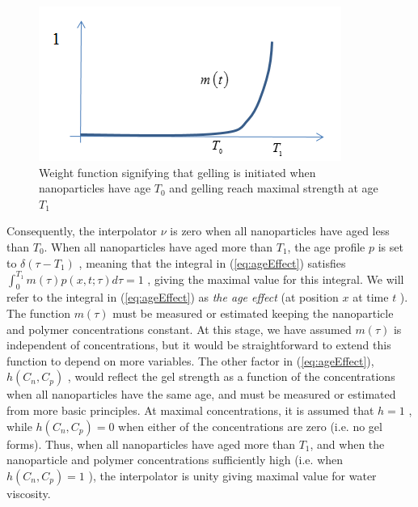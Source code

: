 \begin{figure}[h]
    \centering
    \includegraphics[width=.85\textwidth]{img/fig/weightFunc.png}
    \caption{Weight function signifying that gelling is initiated when nanoparticles have age $T_0$ and gelling reach maximal strength at age $T_1$}
    \label{fig:weightFunc}
\end{figure}

Consequently, the interpolator  $\nu$ is zero when all nanoparticles have aged less than  $T_0$. When all nanoparticles have aged more than  $T_1$, the age profile $p$ is set to  $\delta(\tau-T_1)$ , meaning that the integral in (\ref{eq:ageEffect}) satisfies $\int^{T_1}_{0}m(\tau)p(x,t;\tau)d\tau=1$ , giving the maximal value for this integral. We will refer to the integral in (\ref{eq:ageEffect})  as \textit{the age effect} (at position $x$ at time $t$ ). The function $m(\tau)$ must be measured or estimated keeping the nanoparticle and polymer concentrations constant. At this stage, we have assumed  $m(\tau)$ is independent of concentrations, but it would be straightforward to extend this function to depend on more variables. The other factor in (\ref{eq:ageEffect}), $h(C_n,C_p)$ , would reflect the gel strength as a function of the concentrations when all nanoparticles have the same age, and must be measured or estimated from more basic principles. At maximal concentrations, it is assumed that $h=1$ , while $h(C_n,C_p)=0$ when either of the concentrations are zero (i.e. no gel forms). Thus, when all nanoparticles have aged more than $T_1$, and when the nanoparticle and polymer concentrations sufficiently high (i.e. when $h(C_n,C_p)=1$ ), the interpolator is unity giving maximal value for water viscosity.

